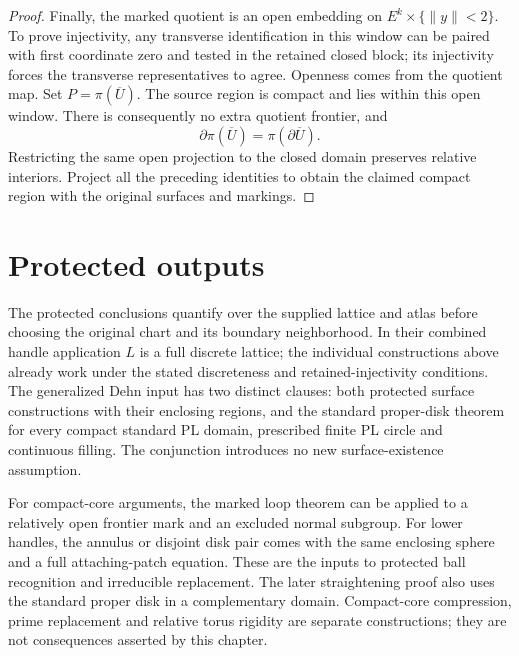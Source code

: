 \begin{proof}
Finally, the marked quotient is an open embedding on
$E^k\times\{\|y\|<2\}$.  To prove injectivity, any transverse
identification in this window can be paired with first coordinate
zero and tested in the retained closed block; its injectivity
forces the transverse representatives to agree.  Openness comes
from the quotient map.  Set $P=\pi(\overline U)$.  The source region
is compact and lies within this open window.  There is consequently
no extra quotient frontier, and
\[
 \partial\pi(\overline U)=\pi(\partial\overline U).
\]
Restricting the same open projection to the closed domain preserves
relative interiors.  Project all the preceding identities to obtain
the claimed compact region with the original surfaces and markings.
\end{proof}

\section{Protected outputs}
\label{sec:dehn-outputs}

The protected conclusions quantify over the supplied lattice and
atlas before choosing the original chart and its boundary
neighborhood.  In their combined handle application $L$ is a full
discrete lattice; the individual constructions above already work
under the stated discreteness and retained-injectivity conditions.
The generalized Dehn input has two distinct clauses: both protected
surface constructions with their enclosing regions, and the standard
proper-disk theorem for every compact standard PL domain, prescribed
finite PL circle and continuous filling.  The conjunction introduces
no new surface-existence assumption.

For compact-core arguments, the marked loop theorem can be applied
to a relatively open frontier mark and an excluded normal subgroup.
For lower handles, the annulus or disjoint disk pair comes with the
same enclosing sphere and a full attaching-patch equation.  These
are the inputs to protected ball recognition and irreducible
replacement.  The later straightening proof also uses the standard
proper disk in a complementary domain.  Compact-core compression,
prime replacement and relative torus rigidity are separate
constructions; they are not consequences asserted by this chapter.
